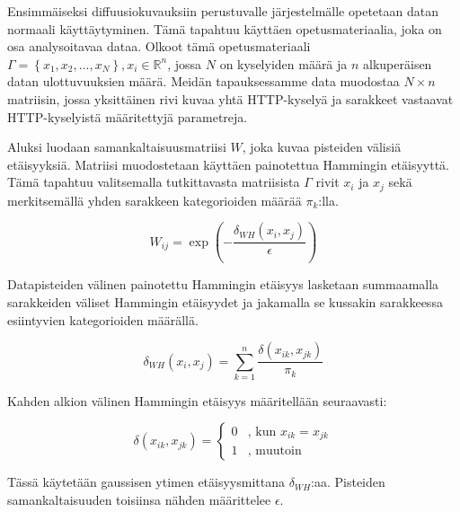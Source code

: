 Ensimmäiseksi diffuusiokuvauksiin perustuvalle järjestelmälle opetetaan datan normaali käyttäytyminen. Tämä tapahtuu käyttäen opetusmateriaalia, joka on osa analysoitavaa dataa. Olkoot tämä opetusmateriaali 
$\Gamma = \left\{ x_1, x_2, \dots , x_N \right\}, x_i \in \mathbb{R}^n$, jossa $N$ on kyselyiden määrä ja $n$ alkuperäisen datan ulottuvuuksien määrä. Meidän tapauksessamme data muodostaa $N \times n$ matriisin, jossa 
yksittäinen rivi kuvaa yhtä HTTP-kyselyä ja sarakkeet vastaavat HTTP-kyselyistä määritettyjä parametreja.

Aluksi luodaan samankaltaisuusmatriisi $W$, joka kuvaa pisteiden välisiä etäisyyksiä.
Matriisi muodostetaan käyttäen painotettua Hammingin etäisyyttä. Tämä tapahtuu valitsemalla tutkittavasta matriisista $\Gamma$ rivit $x_i$ ja $x_j$ sekä merkitsemällä yhden sarakkeen kategorioiden määrää $\pi_k$:lla.


\begin{equation*}
W_{ij} = \exp\left(-\frac{\delta_{WH}(x_i, x_j)}{\epsilon}\right)
\label{KERNEL}
\end{equation*}

\noindent Datapisteiden välinen painotettu Hammingin etäisyys lasketaan summaamalla sarakkeiden väliset Hammingin etäisyydet ja jakamalla se kussakin sarakkeessa esiintyvien kategorioiden määrällä.

\begin{equation*}
\delta_{WH}(x_i,x_j) = \sum_{k=1}^{n} \frac{\delta(x_{ik},x_{jk})}{\pi_k}
\label{W_HAMMING}
\end{equation*}

\noindent Kahden alkion välinen Hammingin etäisyys määritellään seuraavasti:

\begin{equation*}
\delta(x_{ik},x_{jk}) = 
\begin{cases}
0 & \text{, kun } x_{ik} = x_{jk} \\
1 & \text{, muutoin}
\end{cases}
\label{HAMMING}
\end{equation*}

\noindent Tässä käytetään gaussisen ytimen etäisyysmittana $\delta_{WH}$:aa. Pisteiden samankaltaisuuden toisiinsa nähden määrittelee $\epsilon$. 


